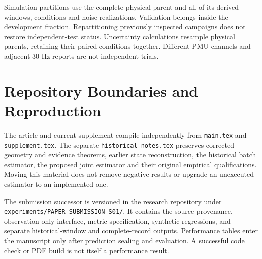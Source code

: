 Simulation partitions use the complete physical parent and all of its
derived windows, conditions and noise realizations. Validation belongs
inside the development fraction. Repartitioning previously inspected
campaigns does not restore independent-test status. Uncertainty calculations
resample physical parents, retaining their paired conditions together.
Different PMU channels and adjacent 30-Hz reports are not independent trials.

\section{Repository Boundaries and Reproduction}

The article and current supplement compile independently from
\texttt{main.tex} and \texttt{supplement.tex}. The separate
\texttt{historical\_notes.tex} preserves corrected geometry and evidence
theorems, earlier state reconstruction, the historical batch estimator,
the proposed joint estimator and their original empirical qualifications.
Moving this material does not remove negative results or upgrade an
unexecuted estimator to an implemented one.\AIDraftingCredit{}

The submission successor is versioned in the research repository under
\nolinkurl{experiments/PAPER_SUBMISSION_S01/}. It contains the source
provenance, observation-only interface, metric specification, synthetic
regressions, and separate historical-window and complete-record outputs.
Performance tables enter the manuscript only after prediction sealing and
evaluation. A successful code check or PDF build is not itself a performance
result.
